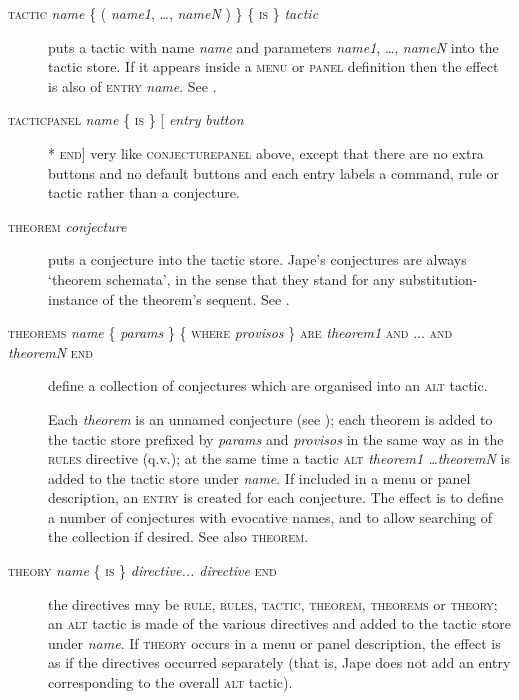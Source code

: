 \begin{description}
\item[\textsc{tactic} \textit{name} \{ ( \textit{name1}, \dots, \textit{nameN} ) \} \{ \textsc{is} \} \textit{tactic}] puts a tactic with name \textit{name} and parameters \textit{name1}, \dots, \textit{nameN} into the tactic store. If it appears inside a \textsc{menu} or \textsc{panel} definition then the effect is also of \textsc{entry} \textit{name}.%
See .

\item[\textsc{tacticpanel} \textit{name} \{ \textsc{is} \} [ \textit{entry} {\textbar} \textit{button} ]* \textsc{end}] very like \textsc{conjecturepanel} above, except that there are no extra buttons and no default buttons and each entry labels a command, rule or tactic rather than a conjecture. %

\item[\textsc{theorem} \textit{conjecture}] puts a conjecture into the tactic store. Jape's conjectures are always `theorem schemata', in the sense that they stand for any substitution-instance of the theorem's sequent. See .

\item[\textsc{theorems} \textit{name} \{ \textit{params} \} \{ \textsc{where} \textit{provisos} \} \textsc{are} \textit{theorem1} \textsc{and} ... \textsc{and} \textit{theoremN} \textsc{end}] define a collection of conjectures which are organised into an \textsc{alt} tactic.

Each \textit{theorem} is an unnamed conjecture (see ); each theorem is added to the tactic store prefixed by \textit{params} and \textit{provisos} in the same way as in the \textsc{rules} directive (q.v.); at the same time a tactic \textsc{alt} \textit{theorem1 \dots theoremN} is added to the tactic store under \textit{name}. If included in a menu or panel description, an \textsc{entry} is created for each conjecture. The effect is to define a number of conjectures with evocative names, and to allow searching of the collection if desired. See also \textsc{theorem}.

\item[\textsc{theory} \textit{name} \{ \textsc{is} \} \textit{directive... directive} \textsc{end}] the directives may be \textsc{rule, rules, tactic, theorem, theorems} or \textsc{theory}; an \textsc{alt} tactic is made of the various directives and added to the tactic store under \textit{name}. If \textsc{theory} occurs in a menu or panel description, the effect is as if the directives occurred separately (that is, Jape does not add an entry corresponding to the overall \textsc{alt} tactic).


\end{description}
